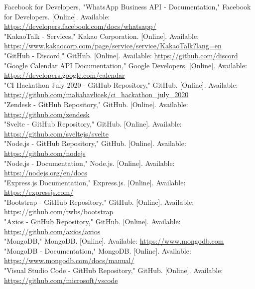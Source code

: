 \documentclass[conference]{IEEEtran}
\begin{document}
\begin{thebibliography}{00}
 Facebook for Developers, "WhatsApp Business API - Documentation," Facebook for Developers. [Online]. Available: \url{https://developers.facebook.com/docs/whatsapp/}\\
 "KakaoTalk - Services," Kakao Corporation. [Online]. Available: \url{https://www.kakaocorp.com/page/service/service/KakaoTalk?lang=en}\\
 "GitHub - Discord," GitHub. [Online]. Available: \url{https://github.com/discord}\\
 "Google Calendar API Documentation," Google Developers. [Online]. Available: \url{https://developers.google.com/calendar}\\
 "CI Hackathon July 2020 - GitHub Repository," GitHub. [Online]. Available: \url{https://github.com/maliahavlicek/ci\_hackathon\_july\_2020}\\
 "Zendesk - GitHub Repository," GitHub. [Online]. Available: \url{https://github.com/zendesk}\\
 "Svelte - GitHub Repository," GitHub. [Online]. Available: \url{https://github.com/sveltejs/svelte}\\
 "Node.js - GitHub Repository," GitHub. [Online]. Available: \url{https://github.com/nodejs}\\
 "Node.js - Documentation," Node.js. [Online]. Available: \url{https://nodejs.org/en/docs}\\
 "Express.js Documentation," Express.js. [Online]. Available: \url{https://expressjs.com/}\\
 "Bootstrap - GitHub Repository," GitHub. [Online]. Available: \url{https://github.com/twbs/bootstrap}\\
 "Axios - GitHub Repository," GitHub. [Online]. Available: \url{https://github.com/axios/axios}\\
 "MongoDB," MongoDB. [Online]. Available: \url{https://www.mongodb.com}\\
 "MongoDB - Documentation," MongoDB. [Online]. Available: \url{https://www.mongodb.com/docs/manual/}\\
 "Visual Studio Code - GitHub Repository," GitHub. [Online]. Available: \url{https://github.com/microsoft/vscode}\\

\end{thebibliography}
\end{document}
